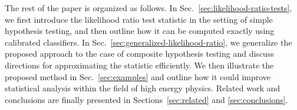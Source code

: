 \documentclass[12pt]{article}
\numberwithin{equation}{section}
\theoremstyle{plain}
\begin{document}
%

The rest of the paper is organized as follows. In
Sec.~\ref{sec:likelihood-ratio-tests}, we first introduce the likelihood
ratio test statistic in the setting of simple hypothesis testing, and then
outline how it can be computed exactly using calibrated classifiers.
In Sec.~\ref{sec:generalized-likelihood-ratio}, we generalize the proposed
approach to the case of composite hypothesis testing and discuss directions for
approximating the statistic efficiently. We then illustrate the proposed
method in Sec.~\ref{sec:examples} and outline how it could improve
statistical analysis within the field of high energy physics. Related work
and conclusions are finally presented in Sections~\ref{sec:related} and \ref{sec:conclusions}.
\end{document}
